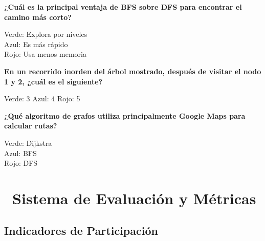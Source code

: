 \documentclass[12pt,a4paper]{article}
\begin{document}
	\textbf{¿Cuál es la principal ventaja de BFS sobre DFS para encontrar el camino más corto?}
	
	\textcolor{secondarygreen}{\faCircle} Verde: Explora por niveles\\
	\textcolor{primaryblue}{\faCircle} Azul: Es más rápido\\
	\textcolor{dangerred}{\faCircle} Rojo: Usa menos memoria
	
	\vspace{0.5cm}
	
	\textbf{En un recorrido inorden del árbol mostrado, después de visitar el nodo 1 y 2, ¿cuál es el siguiente?}
	
	\begin{center}
	\end{center}
	
	\textcolor{secondarygreen}{\faCircle} Verde: 3 \quad
	\textcolor{primaryblue}{\faCircle} Azul: 4 \quad
	\textcolor{dangerred}{\faCircle} Rojo: 5
	
	\vspace{0.5cm}
	
	\textbf{¿Qué algoritmo de grafos utiliza principalmente Google Maps para calcular rutas?}
	
	\textcolor{secondarygreen}{\faCircle} Verde: Dijkstra\\
	\textcolor{primaryblue}{\faCircle} Azul: BFS\\
	\textcolor{dangerred}{\faCircle} Rojo: DFS
	
	\newpage
	
	\section*{\faChartLine\ Sistema de Evaluación y Métricas}
	
	\subsection*{Indicadores de Participación}
	
\end{document}
